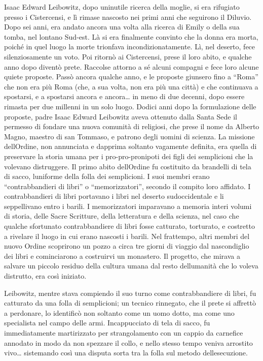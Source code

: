 Isaac Edward Leibowitz, dopo un\textquotesingle inutile ricerca della
moglie, si era rifugiato presso i Cistercensi, e lì rimase nascosto nei
primi anni che seguirono il Diluvio. Dopo sei anni, era andato ancora
una volta alla ricerca di Emily o della sua tomba, nel lontano Sud-est.
Là si era finalmente convinto che la donna era morta, poiché in quel
luogo la morte trionfava incondizionatamente. Lì, nel deserto, fece
silenziosamente un voto. Poi ritornò ai Cistercensi, prese il loro
abito, e qualche anno dopo diventò prete. Raccolse attorno a sé alcuni
compagni e fece loro alcune quiete proposte. Passò ancora qualche anno,
e le proposte giunsero fino a ``Roma'' che non era più Roma (che, a sua
volta, non era più una città) e che continuava a spostarsi, e a
spostarsi ancora e ancora\ldots{} in meno di due decenni, dopo essere
rimasta per due millenni in un solo luogo. Dodici anni dopo la
formulazione delle proposte, padre Isaac Edward Leibowitz aveva ottenuto
dalla Santa Sede il permesso di fondare una nuova comunità di religiosi,
che prese il nome da Alberto Magno, maestro di san Tommaso, e patrono
degli uomini di scienza. La missione dell\textquotesingle Ordine, non
annunciata e dapprima soltanto vagamente definita, era quella di
preservare la storia umana per i pro-pro-pronipoti dei figli dei
semplicioni che la volevano distruggere. Il primo abito
dell\textquotesingle Ordine fu costituito da brandelli di tela di sacco,
l\textquotesingle uniforme della folla dei semplicioni. I suoi membri
erano ``contrabbandieri di libri'' o ``memorizzatori'', secondo il
compito loro affidato. I contrabbandieri di libri portavano i libri nel
deserto sudoccidentale e li seppellivano entro i barili. I memorizzatori
imparavano a memoria interi volumi di storia, delle Sacre Scritture,
della letteratura e della scienza, nel caso che qualche sfortunato
contrabbandiere di libri fosse catturato, torturato, e costretto a
rivelare il luogo in cui erano nascosti i barili. Nel frattempo, altri
membri del nuovo Ordine scoprirono un pozzo a circa tre giorni di
viaggio dal nascondiglio dei libri e cominciarono a costruirvi un
monastero. Il progetto, che mirava a salvare un piccolo residuo della
cultura umana dal resto dell\textquotesingle umanità che lo voleva
distrutto, era così iniziato.

Leibowitz, mentre stava compiendo il suo turno come contrabbandiere di
libri, fu catturato da una folla di semplicioni; un tecnico rinnegato,
che il prete si affrettò a perdonare, lo identificò non soltanto come un
uomo dotto, ma come uno specialista nel campo delle armi. Incappucciato
di tela di sacco, fu immediatamente martirizzato per strangolamento con
un cappio da carnefice annodato in modo da non spezzare il collo, e
nello stesso tempo veniva arrostito vivo\ldots{} sistemando così una
disputa sorta tra la folla sul metodo dell\textquotesingle esecuzione.

